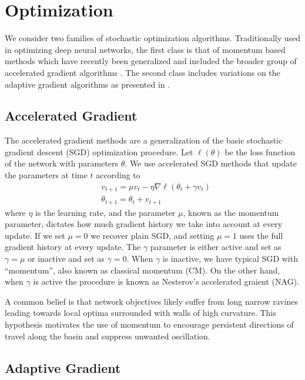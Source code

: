 \section{Optimization}

We consider two families of stochastic optimization algorithms. Traditionally
used in optimizing deep neural networks, the first class is that of momentum
based methods which have recently been generalized and included the broader
group of accelerated gradient algorithms \cite{sutskever_2013}. The second class
includes variations on the adaptive gradient algorithms as presented in
\cite{duchi_2011}.

\subsection{Accelerated Gradient}

The accelerated gradient methods are a generalization of the basic stochastic
gradient descent (SGD) optimization procedure. Let $\ell(\theta)$ be the loss
function of the network with parameters $\theta$. We use accelerated SGD
methods that update the parameters at time $t$ according to
\begin{equation}
\begin{aligned}
&v_{t+1} = \mu v_t - \eta \nabla \ell (\theta_t + \gamma v_t) \\
&\theta_{t+1} = \theta_t + v_{t+1}
\end{aligned}
\end{equation}
where $\eta$ is the learning rate, and the parameter $\mu$, known as the
momentum parameter, dictates how much gradient history we take into account at
every update. If we set $\mu = 0$ we recover plain SGD, and setting $\mu = 1$
uses the full gradient history at every update.  The $\gamma$ parameter is
either active and set as $\gamma = \mu$ or inactive and set as $\gamma = 0$.
When $\gamma$ is inactive, we have typical SGD with ``momentum'', also known as
classical momentum (CM). On the other hand, when $\gamma$ is active the
procedure is known as Nesterov's accelerated graient (NAG).

A common belief is that network objectives likely suffer from long narrow
ravines leading towards local optima surrounded with walls of high curvature.
This hypothesis motivates the use of momentum to encourage persistent
directions of travel along the basin and suppress unwanted oscillation.

\subsection{Adaptive Gradient}

